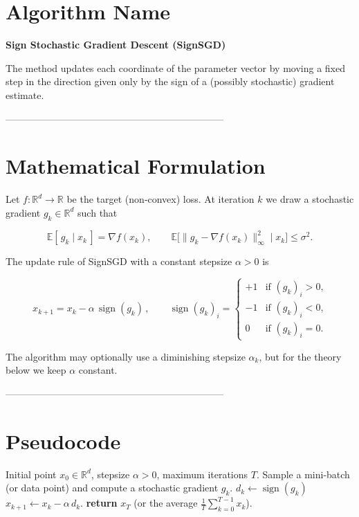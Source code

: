 \documentclass{article}
\newcommand{\sign}{\operatorname{sign}}
\begin{document}
\section*{Algorithm Name}
\textbf{Sign Stochastic Gradient Descent (SignSGD)}  

The method updates each coordinate of the parameter vector by moving a fixed step
in the direction given only by the sign of a (possibly stochastic) gradient
estimate.

--------------------------------------------------------------------

\section*{Mathematical Formulation}
Let $f:\mathbb{R}^{d}\rightarrow\mathbb{R}$ be the target (non‑convex) loss.
At iteration $k$ we draw a stochastic gradient $g_k\in\mathbb{R}^{d}$ such that  

\[
\mathbb{E}[\,g_k\mid x_k\,]=\nabla f(x_k),\qquad 
\mathbb{E}\big[\|g_k-\nabla f(x_k)\|_{\infty}^{2}\mid x_k\big]\le\sigma^{2}.
\]

The update rule of SignSGD with a constant stepsize $\alpha>0$ is  

\[
\boxed{\,x_{k+1}=x_{k}-\alpha\,\sign(g_k)\,},\qquad 
\sign(g_k)_i=\begin{cases}
+1 &\text{if }(g_k)_i>0,\\
-1 &\text{if }(g_k)_i<0,\\
0  &\text{if }(g_k)_i=0 .
\end{cases}
\]

The algorithm may optionally use a diminishing stepsize $\alpha_k$, but for the
theory below we keep $\alpha$ constant.

--------------------------------------------------------------------

\section*{Pseudocode}
\begin{algorithm}[H]
\caption{SignSGD}
\begin{algorithmic}[1]
\Require Initial point $x_{0}\in\mathbb{R}^{d}$, stepsize $\alpha>0$, 
maximum iterations $T$.
    \State Sample a mini‑batch (or data point) and compute a stochastic gradient $g_k$.
    \State $d_k\gets \sign(g_k)$ 
    \State $x_{k+1}\gets x_k-\alpha\,d_k$.
\EndFor
\State \textbf{return} $x_T$ (or the average $\frac1T\sum_{k=0}^{T-1}x_k$).
\end{algorithmic}
\end{algorithm}
\end{document}
